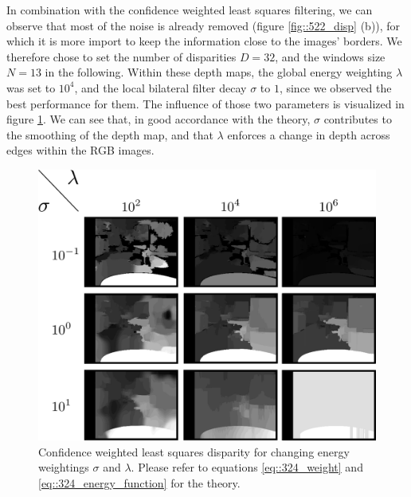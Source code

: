 In combination with the confidence weighted least squares filtering, we can observe that most of the noise is already removed (figure \ref{fig::522_disp} (b)), for which it is more import to keep the information close to the images' borders. We therefore chose to set the number of disparities $D=32$, and the windows size $N=13$ in the following. Within these depth maps, the global energy weighting $\lambda$ was set to $10^4$, and the local bilateral filter decay $\sigma$ to $1$, since we observed the best performance for them. The influence of those two parameters is visualized in figure \ref{fig::522_sigma_lambda}. We can see that, in good accordance with the theory, $\sigma$ contributes to the smoothing of the depth map, and that $\lambda$ enforces a change in depth across edges within the RGB images.
\begin{figure}[h]
	\centering
	\includegraphics[scale=.2]{chapters/05_experiments/02_autonomous_walking/02_depth_map_parameter_tuning/sigma_lambda.png}
	\caption{Confidence weighted least squares disparity for changing energy weightings $\sigma$ and $\lambda$. Please refer to equations \ref{eq::324_weight} and \ref{eq::324_energy_function} for the theory.}
	\label{fig::522_sigma_lambda}
\end{figure}
